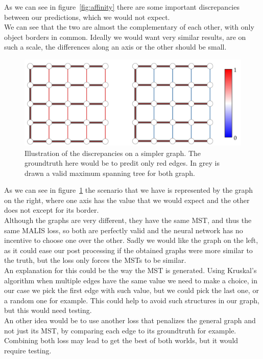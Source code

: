 As we can see in figure~\ref{fig:affinity} there are some important
discrepancies between our predictions, which we would not expect.\\
We can see that the two are almost the complementary of each other, with only
object borders in common. Ideally we would want very similar results, are on
such a scale, the differences along an axis or the other should be small.

\begin{figure}[!htbp]
	\centering
	\includegraphics[width=0.8\linewidth]{./images/discrepancies_graph.png}
	\caption{Illustration of the discrepancies on a simpler graph. The
	groundtruth here would be to predit only red edges. In grey is drawn a
valid maximum spanning tree for both graph.}%
	\label{fig:discrepancies-graph}
\end{figure}

As we can see in figure~\ref{fig:discrepancies-graph} the scenario that we have
is represented by the graph on the right, where one axis has the value that we
would expect and the other does not except for its border.\\
Although the graphs are very different, they have the same MST, and thus the
same MALIS loss, so both are perfectly valid and the neural network has no
incentive to choose one over the other. Sadly we would like the graph on the
left, as it could ease our post processing if the obtained graphs were more
similar to the truth, but the loss only forces the MSTs to be similar.\\

An explanation for this could be the way the MST is generated. Using Kruskal's
algorithm when multiple edges have the same value we need to make a choice, in
our case we pick the first edge with such value, but we could pick the last
one, or a random one for example. This could help to avoid such structures in
our graph, but this would need testing.\\
An other idea would be to use another loss that penalizes the general graph and
not just its MST, by comparing each edge to its groundtruth for example.
Combining both loss may lead to get the best of both worlds, but it would
require testing.

